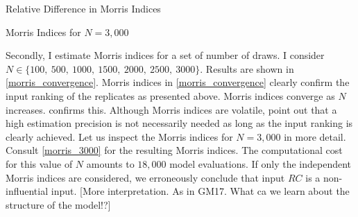\begin{table}
    \caption{Relative Difference in Morris Indices}
    \label{rel_diff_morris}
\end{table}

\begin{table}
    \caption{Morris Indices for $N=3,000$}
    \label{morris_3000}
\end{table}

Secondly, I estimate Morris indices for a set of number of draws. I consider $N \in \{100,\ 500,\ 1000,\ 1500,\ 2000,\ 2500,\ 3000\}$. Results are shown in \cref{morris_convergence}. Morris indices in
\cref{morris_convergence} clearly confirm the input ranking of the replicates as presented above. Morris indices
converge as $N$ increases.  confirms this. Although Morris indices are volatile, \citet{GM17} point out that a high estimation precision is not necessarily needed
as long as the input ranking is clearly achieved.
Let us inspect the Morris indices for $N = 3,000$ in more detail. Consult \cref{morris_3000} for the
resulting Morris indices. The computational cost for this value of $N$ amounts to $18,000$
model evaluations. If only the independent Morris indices are considered, we erroneously
conclude that input $RC$ is a non-influential input. [More interpretation. As in GM17.
What ca we learn about the structure of the model!?]
